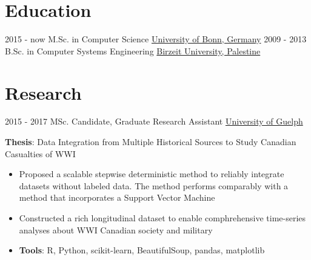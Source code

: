 \documentclass[letterpaper]{twentysecondcv} %
\begin{document}
\makeprofile %

\section{Education}

\begin{twenty} %
	\twentyitem
    	{2015 - now}
        {}
        {M.Sc.  in  Computer Science}
        {\href{https://www.uni-bonn.de/}{University of Bonn, Germany}}
        {}
        {}
	\twentyitem
    	{2009 - 2013}
		{}
        {B.Sc. in Computer Systems Engineering }
        {\href{https://www.birzeit.edu/en}{Birzeit University, Palestine}}
        {}
        {}
\end{twenty}

\section{Research}
\begin{twenty}
	\twentyitem
    	{2015 - 2017}
		{}
        {MSc. Candidate, Graduate Research Assistant}
        {\href{http://www.uoguelph.ca/}{University of Guelph}}
        {}
        {
       	\textbf{Thesis}: Data Integration from Multiple Historical Sources to Study Canadian Casualties of WWI
        {\begin{itemize}
        \item Proposed a scalable stepwise deterministic method to reliably integrate datasets without labeled data. The method performs comparably with a method that incorporates a Support Vector Machine
        \item Constructed a rich longitudinal dataset to enable comphrehensive time-series analyses about WWI Canadian society and military
        \item \textbf{Tools}: R, Python, scikit-learn, BeautifulSoup, pandas, matplotlib \vspace{2mm}
		\end{itemize}}
        }
\end{twenty}

\end{document}
